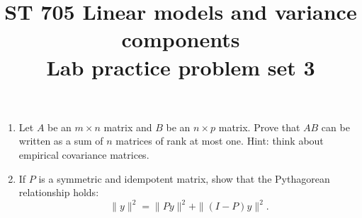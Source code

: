 \documentclass[11pt]{article}
\title{ST 705 Linear models and variance components \\ 
        Lab practice problem set 3}
\begin{document}
\maketitle

\begin{enumerate}


\item Let $A$ be an $m\times n$ matrix and $B$ be an $n\times p$ matrix.  Prove that $AB$ can be written as a sum of $n$ matrices of rank at most one.  Hint: think about empirical covariance matrices.   


\item If $P$ is a symmetric and idempotent matrix, show that the Pythagorean relationship holds:
\[
\|y\|^{2} = \|Py\|^{2} + \|(I-P)y\|^{2}.
\]


\end{enumerate}
\end{document}
